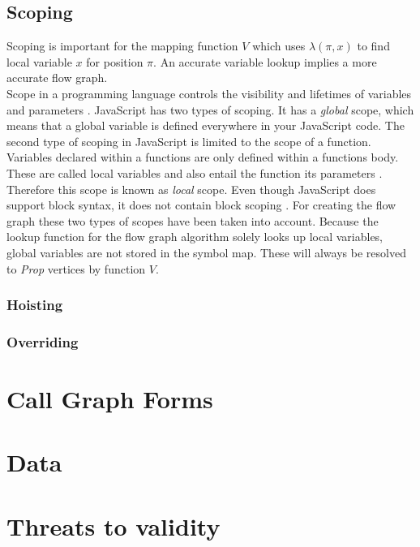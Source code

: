 \documentclass[journal,10pt]{IEEEtran} %
\begin{document}
\subsection{Scoping}
Scoping is important for the mapping function $V$ which uses $\lambda(\pi, x)$ to find local variable $x$ for position $\pi$. An accurate variable lookup implies a more accurate flow graph. \\ %
Scope in a programming language controls the visibility and lifetimes of variables and parameters \cite[p.36]{Crockford:2008:JGP}. JavaScript has two types of scoping. It has a \textit{global} scope, which means that a global variable is defined everywhere in your JavaScript code. The second type of scoping in
JavaScript is limited to the scope of a function. Variables declared within a functions are only defined within a functions body. These are called local variables and also entail the function its parameters \cite[p.53]{flanagan2011javascript}. Therefore this scope is known as \textit{local} scope. Even though JavaScript does support block syntax, it does not contain block scoping \cite[p.36]{Crockford:2008:JGP}.
For creating the flow graph these two types of scopes have been taken into account. Because the lookup function for the flow graph algorithm solely looks up local variables, global variables are not stored in the symbol map. These will always be resolved to \textit{Prop} vertices by function $V$.



\subsubsection{Hoisting}


\subsubsection{Overriding}


\section{Call Graph Forms}


\section{Data}

\section{Threats to validity}
\end{document}
